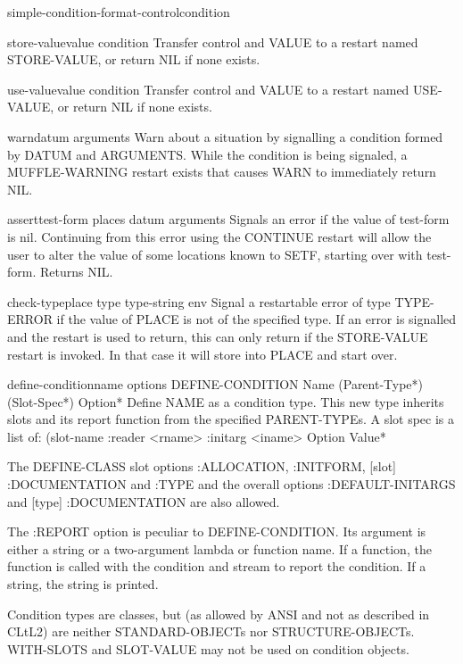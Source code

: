 \documentclass[10pt,english]{book}
\begin{document}
\begin{function}{simple-condition-format-control}{condition}
  
\end{function}

\begin{function}{store-value}{value \op condition}
  Transfer control and VALUE to a restart named STORE-VALUE, or return NIL if
   none exists.
\end{function}

\begin{function}{use-value}{value \op condition}
  Transfer control and VALUE to a restart named USE-VALUE, or return NIL if
   none exists.
\end{function}

\begin{function}{warn}{datum \rest arguments}
  Warn about a situation by signalling a condition formed by DATUM and
   ARGUMENTS. While the condition is being signaled, a MUFFLE-WARNING restart
   exists that causes WARN to immediately return NIL.
\end{function}

\begin{macro}{assert}{test-form \op places datum \rest arguments}
  Signals an error if the value of test-form is nil. Continuing from this
   error using the CONTINUE restart will allow the user to alter the value of
   some locations known to SETF, starting over with test-form. Returns NIL.
\end{macro}

\begin{macro}{check-type}{place type \op type-string \env env}
  Signal a restartable error of type TYPE-ERROR if the value of PLACE
is not of the specified type. If an error is signalled and the restart
is used to return, this can only return if the STORE-VALUE restart is
invoked. In that case it will store into PLACE and start over.
\end{macro}

\begin{macro}{define-condition}{name \rest \rest \body options}
  DEFINE-CONDITION Name (Parent-Type*) (Slot-Spec*) Option*
   Define NAME as a condition type. This new type inherits slots and its
   report function from the specified PARENT-TYPEs. A slot spec is a list of:
     (slot-name :reader <rname> :initarg <iname> {Option Value}*

   The DEFINE-CLASS slot options :ALLOCATION, :INITFORM, [slot] :DOCUMENTATION
   and :TYPE and the overall options :DEFAULT-INITARGS and
   [type] :DOCUMENTATION are also allowed.

   The :REPORT option is peculiar to DEFINE-CONDITION. Its argument is either
   a string or a two-argument lambda or function name. If a function, the
   function is called with the condition and stream to report the condition.
   If a string, the string is printed.

   Condition types are classes, but (as allowed by ANSI and not as described in
   CLtL2) are neither STANDARD-OBJECTs nor STRUCTURE-OBJECTs. WITH-SLOTS and
   SLOT-VALUE may not be used on condition objects.
\end{macro}
\end{document}

